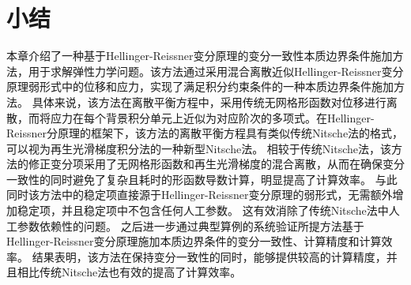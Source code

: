 \section{小结}
本章介绍了一种基于Hellinger-Reissner变分原理的变分一致性本质边界条件施加方法，用于求解弹性力学问题。该方法通过采用混合离散近似Hellinger-Reissner变分原理弱形式中的位移和应力，实现了满足积分约束条件的一种本质边界条件施加方法。
具体来说，该方法在离散平衡方程中，采用传统无网格形函数对位移进行离散，而将应力在每个背景积分单元上近似为对应阶次的多项式。在Hellinger-Reissner分原理的框架下，该方法的离散平衡方程具有类似传统Nitsche法的格式，可以视为再生光滑梯度积分法的一种新型Nitsche法。
相较于传统Nitsche法，该方法的修正变分项采用了无网格形函数和再生光滑梯度的混合离散，从而在确保变分一致性的同时避免了复杂且耗时的形函数导数计算，明显提高了计算效率。
与此同时该方法中的稳定项直接源于Hellinger-Reissner变分原理的弱形式，无需额外增加稳定项，并且稳定项中不包含任何人工参数。
这有效消除了传统Nitsche法中人工参数依赖性的问题。
之后进一步通过典型算例的系统验证所提方法基于Hellinger-Reissner变分原理施加本质边界条件的变分一致性、计算精度和计算效率。
结果表明，该方法在保持变分一致性的同时，能够提供较高的计算精度，并且相比传统Nitsche法也有效的提高了计算效率。

